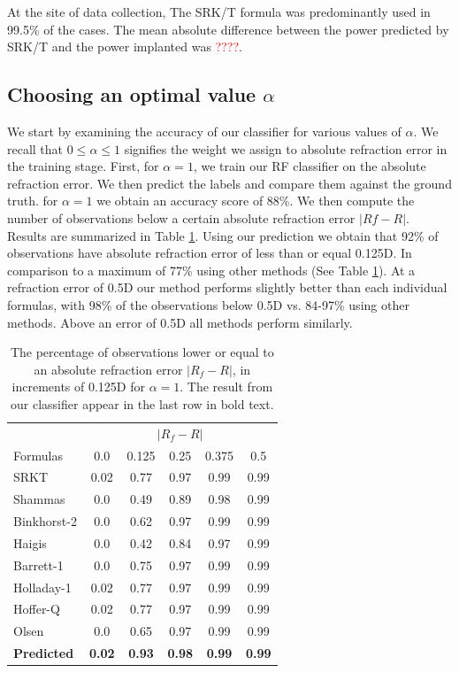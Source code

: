 \documentclass[article,twocolumn,preprint,10pt]{paper}%
\renewcommand{\(}{\left(}
\renewcommand{\)}{\right)}
\renewcommand{\[}{\left[}
\renewcommand{\]}{\right]}
\newcommand{\red}{\textcolor{red}}
\newcommand{\1}{\mbox{\boldmath$1$}}
\begin{document}
At the site of data collection, The SRK/T formula was predominantly used in 99.5\% of the cases.
The mean absolute difference between the power predicted by SRK/T and the power implanted was \red{????}.

\subsection{Choosing an optimal value $\alpha$}
We start by examining the accuracy of our classifier for various values of $\alpha$. We recall that $0\leq\alpha\leq1$ signifies the weight we assign to absolute refraction error in the training stage. 
First, for $\alpha=1$, we train our RF classifier on the absolute refraction error.
We then predict the labels and compare them against the ground truth. for $\alpha=1$ we obtain an accuracy score of 88\%. We then compute the number of observations below a certain absolute refraction error $|Rf-R|$. Results are summarized in Table \ref{table:RefErrAlpha1}. Using our prediction we obtain that 92\% of observations have absolute refraction error of less than or equal 0.125D. In comparison to a maximum of 77\% using other methods (See Table \ref{table:RefErrAlpha1}). At a refraction error of 0.5D our method performs slightly better than each individual formulas, with 98\% of the observations below 0.5D vs. 84-97\% using other methods. Above an error of 0.5D all methods perform similarly.
\begin{table}
	\begin{tabular}{l|c|c|c|c|c}
		            &\multicolumn{5}{c}{$|R_f-R|$}\\
		Formulas	& 0.0 & 0.125 & 0.25 &	0.375	& 0.5\\
		\hline 
		\hline
		SRKT           & 0.02 & 0.77 & 0.97 & 0.99 & 0.99 \\
		Shammas	    & 0.0  & 0.49 & 0.89 & 0.98 & 0.99\\
		Binkhorst-2 & 0.0  & 0.62 & 0.97 & 0.99 & 0.99\\
		Haigis	       & 0.0  & 0.42 & 0.84 & 0.97 & 0.99\\
		Barrett-1	  & 0.0  & 0.75 & 0.97 & 0.99 & 0.99\\
		Holladay-1	& 0.02 & 0.77 & 0.97 & 0.99 & 0.99\\
		Hoffer-Q	& 0.02 & 0.77 & 0.97 & 0.99 & 0.99\\
		Olsen	      & 0.0  & 0.65 & 0.97 & 0.99 & 0.99\\
		\textbf{Predicted}	& \textbf{0.02} & \textbf{0.93} & \textbf{0.98} &\textbf{0.99}& \textbf{0.99}
	\end{tabular}
     \label{table:RefErrAlpha1}
     \caption{The percentage of observations lower or equal to an absolute refraction error $|R_f-R|$, in increments of 0.125D for $\alpha=1$. The result from our classifier appear in the last row in bold text.}
\end{table}
\end{document}
